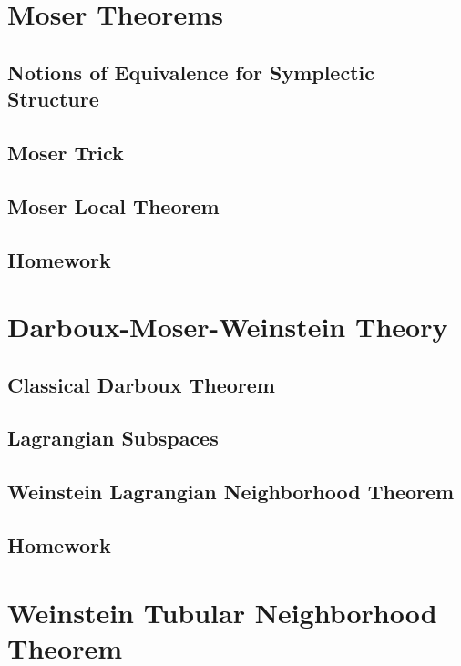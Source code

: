 \documentclass[4paper]{article}
\begin{document}
\section{Moser Theorems}

\subsection{Notions of Equivalence for Symplectic Structure}

\subsection{Moser Trick}

\subsection{Moser Local Theorem}

\subsection{Homework}

\section{Darboux-Moser-Weinstein Theory}

\subsection{Classical Darboux Theorem}

\subsection{Lagrangian Subspaces}

\subsection{Weinstein Lagrangian Neighborhood Theorem}

\subsection{Homework}

\section{Weinstein Tubular Neighborhood Theorem}
\end{document}

